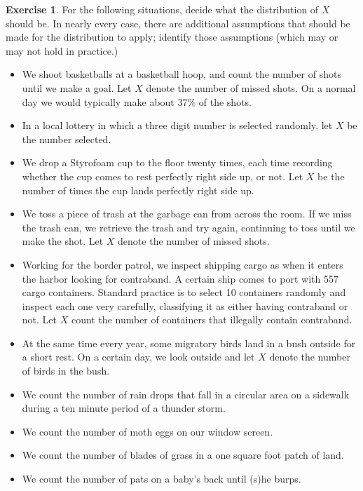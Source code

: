 \documentclass[]{book}
\providecommand{\tightlist}{%
  \setlength{\itemsep}{0pt}\setlength{\parskip}{0pt}}
\numberwithin{equation}{chapter}
\numberwithin{figure}{chapter}
\theoremstyle{plain}
\theoremstyle{definition}
\newtheorem{xca}{Exercise}[chapter]
\theoremstyle{remark}
\theoremstyle{definition}
\theoremstyle{definition}
\theoremstyle{remark}
\begin{document}
\bigskip

\begin{xca}
For the following situations, decide what the distribution of \(X\)
should be. In nearly every case, there are additional assumptions that
should be made for the distribution to apply; identify those assumptions
(which may or may not hold in practice.)

\begin{itemize}
\tightlist
\item
  We shoot basketballs at a basketball hoop, and count the number of
  shots until we make a goal. Let \(X\) denote the number of missed
  shots. On a normal day we would typically make about 37\% of the
  shots.
\item
  In a local lottery in which a three digit number is selected randomly,
  let \(X\) be the number selected.
\item
  We drop a Styrofoam cup to the floor twenty times, each time recording
  whether the cup comes to rest perfectly right side up, or not. Let
  \(X\) be the number of times the cup lands perfectly right side up.
\item
  We toss a piece of trash at the garbage can from across the room. If
  we miss the trash can, we retrieve the trash and try again, continuing
  to toss until we make the shot. Let \(X\) denote the number of missed
  shots.
\item
  Working for the border patrol, we inspect shipping cargo as when it
  enters the harbor looking for contraband. A certain ship comes to port
  with 557 cargo containers. Standard practice is to select 10
  containers randomly and inspect each one very carefully, classifying
  it as either having contraband or not. Let \(X\) count the number of
  containers that illegally contain contraband.
\item
  At the same time every year, some migratory birds land in a bush
  outside for a short rest. On a certain day, we look outside and let
  \(X\) denote the number of birds in the bush.
\item
  We count the number of rain drops that fall in a circular area on a
  sidewalk during a ten minute period of a thunder storm.
\item
  We count the number of moth eggs on our window screen.
\item
  We count the number of blades of grass in a one square foot patch of
  land.
\item
  We count the number of pats on a baby's back until (s)he burps.
\end{itemize}
\end{xca}
\end{document}
